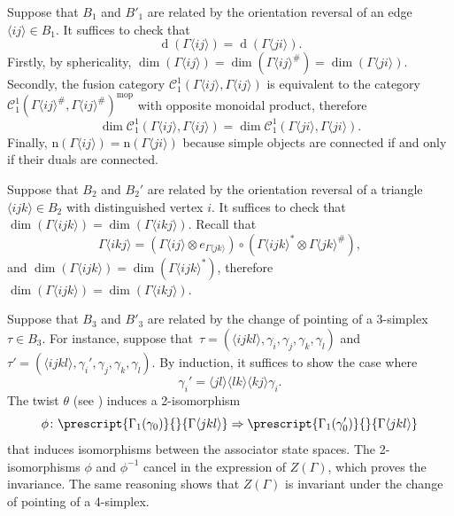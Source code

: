 \documentclass[a4paper, oneside]{amsart}
\DeclareMathOperator{\wdim}{d}
\numberwithin{equation}{subsection}
\theoremstyle{referencedlemma}
\theoremstyle{plain} %
\theoremstyle{remark}
\begin{document}
Suppose that $B_1$ and $B'_1$ are related by the orientation reversal of an edge $\langle ij\rangle \in B_1$. It suffices to check that 
$$
\wdim(\Gamma\langle ij\rangle) = \wdim(\Gamma\langle ji\rangle).
$$
Firstly, by sphericality, $\dim(\Gamma\langle ij\rangle) = \dim(\Gamma\langle ij\rangle^\#) = \dim(\Gamma\langle ji\rangle)$.  Secondly, the fusion category $\mathcal{C}^1_1(\Gamma\langle ij\rangle, \Gamma\langle ij\rangle)$ is equivalent to the category $\mathcal{C}^1_1(\Gamma\langle ij\rangle^\#, \Gamma\langle ij\rangle^\#)^{\mathrm{mop}}$ with opposite monoidal product, therefore 
$$
\dim \mathcal{C}^1_1(\Gamma\langle ij\rangle, \Gamma\langle ij\rangle) = \dim \mathcal{C}^1_1(\Gamma\langle ji\rangle, \Gamma\langle ji\rangle).
$$
Finally, $\mathrm{n}(\Gamma\langle ij\rangle) = \mathrm{n}(\Gamma\langle ji\rangle)$ because simple objects are connected if and only if their duals are connected. 

Suppose that $B_2$ and $B_2'$ are related by the orientation reversal of a triangle $\langle ijk\rangle \in B_2$ with distinguished vertex $i$.  It suffices to check that $\dim(\Gamma\langle ijk \rangle) = \dim(\Gamma\langle ikj\rangle)$.  Recall that 
$$
\Gamma\langle ikj\rangle = (\Gamma\langle ij\rangle \otimes e_{\Gamma\langle jk\rangle})\circ (\Gamma\langle ijk \rangle^*\otimes \Gamma\langle jk\rangle^\#), 
$$
and $\dim(\Gamma\langle ijk\rangle) = \dim(\Gamma\langle ijk \rangle^*)$, therefore $\dim(\Gamma\langle ijk \rangle) = \dim(\Gamma\langle ikj\rangle)$.

Suppose that $B_3$ and $B'_3$ are related by the change of pointing of a 3-simplex $\tau \in B_3$.  For instance, suppose that~$\tau = (\langle ijkl\rangle, \gamma_i, \gamma_j, \gamma_k, \gamma_l)$ and $\tau' = (\langle ijkl\rangle, \gamma_i', \gamma_j, \gamma_k, \gamma_l)$. By induction, it suffices to show the case where
$$
\gamma_i' = \langle jl \rangle \langle lk\rangle \langle kj\rangle \gamma_i.
$$ 
The twist $\theta$ (see \cite[Definition 2.2.4]{douglas_fusion_2018}) induces a 2-isomorphism 
\begin{equation}\label{twist_iso}
\phi\colon \prescript{\Gamma_1(\gamma_0)}{}{\Gamma\langle jkl\rangle} \Rightarrow  \prescript{\Gamma_1(\gamma_0')}{}{\Gamma\langle jkl\rangle}
\end{equation}
that induces isomorphisms between the associator state spaces. The 2-isomorphisms $\phi$ and $\phi^{-1}$ cancel in the expression of $Z(\Gamma)$, which proves the invariance.  The same reasoning shows that $Z(\Gamma)$ is invariant under the change of pointing of a 4-simplex. 
\end{document}
